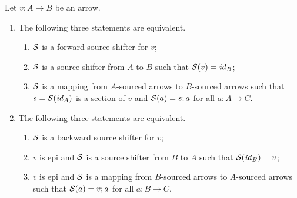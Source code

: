 \begin{proposition}
Let $v:A\to B$ be an arrow.
\begin{enumerate}
\item The following three statements are equivalent.
\begin{enumerate}
\item\label{forward-1} $\mathcal{S}$ is a forward source shifter for $v$;
\item\label{forward-2} $\mathcal{S}$ is a source shifter from $A$ to $B$ such that $\mathcal{S}(v)=\mathit{id}_B$;
\item\label{forward-3} $\mathcal{S}$ is a mapping from $A$-sourced arrows to $B$-sourced arrows such that $s=\mathcal{S}(\mathit{id}_A)$ is a section of $v$ and $\mathcal{S}(a)=s;a$ for all $a:A\to C$.
\end{enumerate}
\item The following three statements are equivalent.
\begin{enumerate}
\item\label{backward-1} $\mathcal{S}$ is a backward source shifter for $v$;
\item\label{backward-2} $v$ is epi and $\mathcal{S}$ is a source shifter from $B$ to $A$ such that $\mathcal{S}(\mathit{id}_B)=v$;
\item\label{backward-3} $v$ is epi and $\mathcal{S}$ is a mapping from $B$-sourced arrows to $A$-sourced arrows such that $\mathcal{S}(a)=v;a$ for all $a:B\to C$.
\end{enumerate}
\end{enumerate}
\end{proposition}
%
